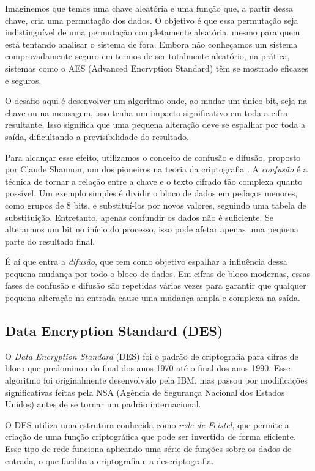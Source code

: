 Imaginemos que temos uma chave aleatória e uma função que, a partir dessa chave, cria uma permutação dos dados.
O objetivo é que essa permutação seja indistinguível de uma permutação completamente aleatória, mesmo para quem está tentando analisar o sistema de fora.
Embora não conheçamos um sistema comprovadamente seguro em termos de ser totalmente aleatório, na prática, sistemas como o AES (Advanced Encryption Standard) têm se mostrado eficazes e seguros.

O desafio aqui é desenvolver um algoritmo onde, ao mudar um único bit, seja na chave ou na mensagem, isso tenha um impacto significativo em toda a cifra resultante.
Isso significa que uma pequena alteração deve se espalhar por toda a saída, dificultando a previsibilidade do resultado.

Para alcançar esse efeito, utilizamos o conceito de confusão e difusão, proposto por Claude Shannon, um dos pioneiros na teoria da criptografia \cite{Shannon49}.
A {\em confusão} é a técnica de tornar a relação entre a chave e o texto cifrado tão complexa quanto possível.
Um exemplo simples é dividir o bloco de dados em pedaços menores, como grupos de 8 bits, e substituí-los por novos valores, seguindo uma tabela de substituição.
Entretanto, apenas confundir os dados não é suficiente.
Se alterarmos um bit no início do processo, isso pode afetar apenas uma pequena parte do resultado final.

É aí que entra a {\em difusão}, que tem como objetivo espalhar a influência dessa pequena mudança por todo o bloco de dados.
Em cifras de bloco modernas, essas fases de confusão e difusão são repetidas várias vezes para garantir que qualquer pequena alteração na entrada cause uma mudança ampla e complexa na saída.


\subsection{Data Encryption Standard (DES)}
\label{sec:des}

O {\em Data Encryption Standard} (DES) foi o padrão de criptografia para cifras de bloco que predominou do final dos anos 1970 até o final dos anos 1990.
Esse algoritmo foi originalmente desenvolvido pela IBM, mas passou por modificações significativas feitas pela NSA (Agência de Segurança Nacional dos Estados Unidos) antes de se tornar um padrão internacional.

O DES utiliza uma estrutura conhecida como {\em rede de Feistel}, que permite a criação de uma função criptográfica que pode ser invertida de forma eficiente.
Esse tipo de rede funciona aplicando uma série de funções sobre os dados de entrada, o que facilita a criptografia e a descriptografia.

